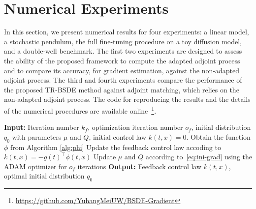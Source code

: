 \documentclass[letterpaper, 10 pt, conference]{ieeeconf}  %
\begin{document}


\section{Numerical Experiments}\label{sec:num}
In this section, we present numerical results for four experiments: a linear model, a stochastic pendulum, the full fine-tuning procedure on a toy diffusion model, and a double-well benchmark. The first two experiments are designed to assess the ability of the proposed framework to compute the adapted adjoint process and to compare its accuracy, for gradient estimation, against the non-adapted adjoint process. 
The third and fourth experiments compare the performance of the proposed TR-BSDE method against adjoint matching, which relies on the non-adapted adjoint process.
The code for reproducing the results and the details of the numerical procedures are available online~\footnote{\url{https://github.com/YuhangMeiUW/BSDE-Gradient}}.


\begin{algorithm}[htbp]
\caption{Fine-tuning the diffusion model} 
\begin{algorithmic}[1]
\STATE \textbf{Input:}  Iteration number $k_f$, optimization iteration number $o_f$, initial distribution $q_0$ with parameters $\mu$ and $Q$, initial control law $k(t,x) =0$.
\STATE Obtain the function  $\phi$ from Algorithm \ref{alg:phi} 
\STATE Update the feedback control law accoding to $k(t,x) = - g(t)^\top\phi(t,x)$
\STATE Update $\mu$ and $Q$ according to~\eqref{eq:ini-grad} using the ADAM optimizer for $o_f$ iterations
\ENDIF
\ENDFOR
\STATE \textbf{Output:} Feedback control law $k(t,x)$, optimal initial distribution $q_0$
\end{algorithmic}
\label{alg:fine-tune}
\end{algorithm}
\end{document}
